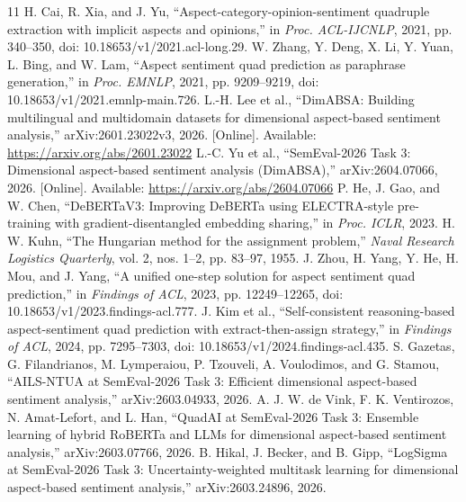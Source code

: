 \documentclass[conference]{IEEEtran}
\begin{document}
\begin{thebibliography}{11}
 H. Cai, R. Xia, and J. Yu, ``Aspect-category-opinion-sentiment quadruple extraction with implicit aspects and opinions,'' in \emph{Proc. ACL-IJCNLP}, 2021, pp. 340--350, doi: 10.18653/v1/2021.acl-long.29.
 W. Zhang, Y. Deng, X. Li, Y. Yuan, L. Bing, and W. Lam, ``Aspect sentiment quad prediction as paraphrase generation,'' in \emph{Proc. EMNLP}, 2021, pp. 9209--9219, doi: 10.18653/v1/2021.emnlp-main.726.
 L.-H. Lee et al., ``DimABSA: Building multilingual and multidomain datasets for dimensional aspect-based sentiment analysis,'' arXiv:2601.23022v3, 2026. [Online]. Available: \url{https://arxiv.org/abs/2601.23022}
 L.-C. Yu et al., ``SemEval-2026 Task 3: Dimensional aspect-based sentiment analysis (DimABSA),'' arXiv:2604.07066, 2026. [Online]. Available: \url{https://arxiv.org/abs/2604.07066}
 P. He, J. Gao, and W. Chen, ``DeBERTaV3: Improving DeBERTa using ELECTRA-style pre-training with gradient-disentangled embedding sharing,'' in \emph{Proc. ICLR}, 2023.
 H. W. Kuhn, ``The Hungarian method for the assignment problem,'' \emph{Naval Research Logistics Quarterly}, vol. 2, nos. 1--2, pp. 83--97, 1955.
 J. Zhou, H. Yang, Y. He, H. Mou, and J. Yang, ``A unified one-step solution for aspect sentiment quad prediction,'' in \emph{Findings of ACL}, 2023, pp. 12249--12265, doi: 10.18653/v1/2023.findings-acl.777.
 J. Kim et al., ``Self-consistent reasoning-based aspect-sentiment quad prediction with extract-then-assign strategy,'' in \emph{Findings of ACL}, 2024, pp. 7295--7303, doi: 10.18653/v1/2024.findings-acl.435.
 S. Gazetas, G. Filandrianos, M. Lymperaiou, P. Tzouveli, A. Voulodimos, and G. Stamou, ``AILS-NTUA at SemEval-2026 Task 3: Efficient dimensional aspect-based sentiment analysis,'' arXiv:2603.04933, 2026.
 A. J. W. de Vink, F. K. Ventirozos, N. Amat-Lefort, and L. Han, ``QuadAI at SemEval-2026 Task 3: Ensemble learning of hybrid RoBERTa and LLMs for dimensional aspect-based sentiment analysis,'' arXiv:2603.07766, 2026.
 B. Hikal, J. Becker, and B. Gipp, ``LogSigma at SemEval-2026 Task 3: Uncertainty-weighted multitask learning for dimensional aspect-based sentiment analysis,'' arXiv:2603.24896, 2026.
\end{thebibliography}
\end{document}
